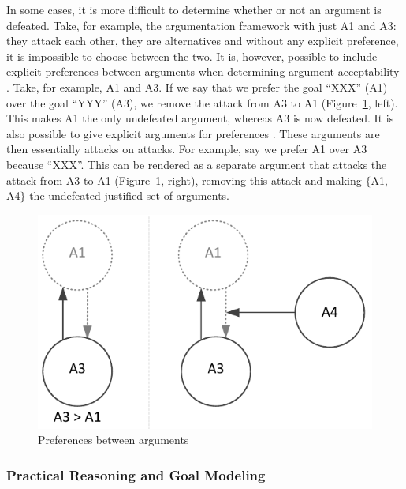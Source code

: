 \documentclass[11.5pt,two column]{llncs}
\begin{document}
In some cases, it is more difficult to determine whether or not an argument is defeated. Take, for example, the argumentation framework with just A1 and A3: they attack each other, they are alternatives and without any explicit preference, it is impossible to choose between the two. It is, however, possible to include explicit preferences between arguments when determining argument acceptability \cite{Amgoud}. Take, for example, A1 and A3. If we say that we prefer the goal ``XXX'' (A1) over the goal ``YYY'' (A3), we remove the attack from A3 to A1 (Figure~\ref{fig:pras:example2}, left). This makes A1 the only undefeated argument, whereas A3 is now defeated. It is also possible to give explicit arguments for preferences \cite{Modgil2009}. These arguments are then essentially attacks on attacks. For example, say we prefer A1 over A3 because ``XXX''. This can be rendered as a separate argument that attacks the attack from A3 to A1 (Figure~\ref{fig:pras:example2}, right), removing this attack and making $\{$A1, A4$\}$ the undefeated justified set of arguments.

\begin{figure}[ht]
\centering
\includegraphics[scale=0.6]{img/Fig2}
\caption{Preferences between arguments}
\label{fig:pras:example2}
\end{figure}  

\subsubsection{Practical Reasoning and Goal Modeling}
\label{sect:background:pras:motivation}
\end{document}
